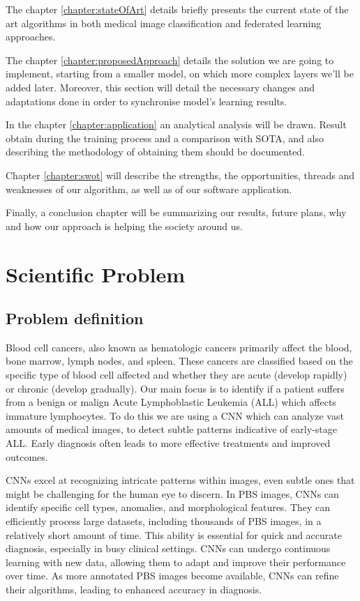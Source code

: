 \documentclass[runningheads,a4paper,11pt]{report}
\begin{document}
The chapter \ref{chapter:stateOfArt} details briefly presents the current state of the art algorithms in both medical image classification and federated learning approaches.

The chapter \ref{chapter:proposedApproach} details the solution we are going to implement, starting from a smaller model, on which more complex layers we'll be added later. Moreover, this section will detail the necessary changes and adaptations done in order to synchronise model's learning results.

In the chapter \ref{chapter:application} an analytical analysis will be drawn. Result obtain during the training process and a comparison with SOTA, and also describing the methodology of obtaining them should be documented.

Chapter \ref{chapter:swot} will describe the strengths, the opportunities, threads and weaknesses of our algorithm, as well as of our software application.

Finally, a conclusion chapter will be summarizing our results, future plans, why and how our approach is helping the society around us.



\chapter{Scientific Problem}
\label{section:scientificProblem}


\section{Problem definition}
\label{section:problemDefinition}

Blood cell cancers, also known as hematologic cancers primarily affect the blood, bone marrow, lymph nodes, and spleen. These cancers are classified based on the specific type of blood cell affected and whether they are acute (develop rapidly) or chronic (develop gradually). Our main focus is to identify if a patient suffers from a benign or malign  Acute Lymphoblastic Leukemia (ALL) which affects immature lymphocytes. To do this we are using a CNN which  can analyze vast amounts of medical images, to detect subtle patterns indicative of early-stage ALL. Early diagnosis often leads to more effective treatments and improved outcomes. 

CNNs excel at recognizing intricate patterns within images, even subtle ones that might be challenging for the human eye to discern. In PBS images, CNNs can identify specific cell types, anomalies, and morphological features. They can efficiently process large datasets, including thousands of PBS images, in a relatively short amount of time. This ability is essential for quick and accurate diagnosis, especially in busy clinical settings. CNNs can undergo continuous learning with new data, allowing them to adapt and improve their performance over time. As more annotated PBS images become available, CNNs can refine their algorithms, leading to enhanced accuracy in diagnosis.
\end{document}
